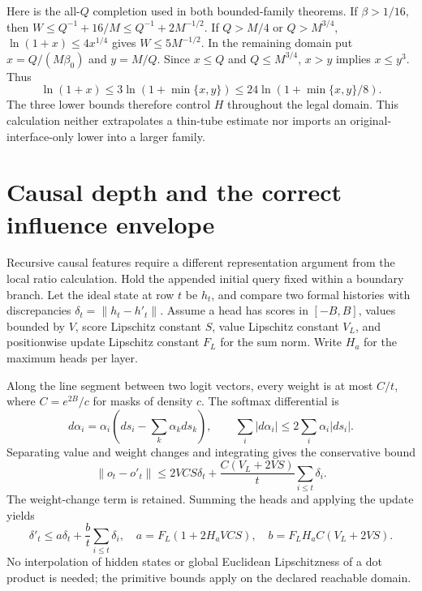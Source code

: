 \documentclass[11pt,letterpaper]{article}
\theoremstyle{definition}\newtheorem{definition}[theorem]{Definition}
\theoremstyle{remark}\newtheorem{remark}[theorem]{Remark}
\newcommand{\betaz}{\beta_0}
\begin{document}
Here is the all-$Q$ completion used in both bounded-family theorems. If $\beta>1/16$, then $W\le Q^{-1}+16/M\le Q^{-1}+2M^{-1/2}$. If $Q>M/4$ or $Q>M^{3/4}$, $\ln(1+x)\le4x^{1/4}$ gives $W\le5M^{-1/2}$. In the remaining domain put $x=Q/(M\betaz)$ and $y=M/Q$. Since $x\le Q$ and $Q\le M^{3/4}$, $x>y$ implies $x\le y^3$. Thus
\[
 \ln(1+x)\le3\ln(1+\min\{x,y\})
 \le24\ln(1+\min\{x,y\}/8).
\]
The three lower bounds therefore control $H$ throughout the legal domain. This calculation neither extrapolates a thin-tube estimate nor imports an original-interface-only lower into a larger family.

\section{Causal depth and the correct influence envelope}\label{sec:causal}
Recursive causal features require a different representation argument from the local ratio calculation. Hold the appended initial query fixed within a boundary branch. Let the ideal state at row $t$ be $h_t$, and compare two formal histories with discrepancies $\delta_t=\|h_t-h'_t\|$. Assume a head has scores in $[-B,B]$, values bounded by $V$, score Lipschitz constant $S$, value Lipschitz constant $V_L$, and positionwise update Lipschitz constant $F_L$ for the sum norm. Write $H_a$ for the maximum heads per layer.

Along the line segment between two logit vectors, every weight is at most $C/t$, where $C=e^{2B}/c$ for masks of density $c$. The softmax differential is
\[
 d\alpha_i=\alpha_i\left(ds_i-\sum_k\alpha_kds_k\right),\qquad
 \sum_i|d\alpha_i|\le2\sum_i\alpha_i|ds_i|.
\]
Separating value and weight changes and integrating gives the conservative bound
\[
 \|o_t-o'_t\|\le2VCS\delta_t+
 \frac{C(V_L+2VS)}{t}\sum_{i\le t}\delta_i.
\]
The weight-change term is retained. Summing the heads and applying the update yields
\begin{equation}\label{eq:recurrence}
 \delta'_t\le a\delta_t+\frac b t\sum_{i\le t}\delta_i,
 \quad a=F_L(1+2H_aVCS),\quad b=F_LH_aC(V_L+2VS).
\end{equation}
No interpolation of hidden states or global Euclidean Lipschitzness of a dot product is needed; the primitive bounds apply on the declared reachable domain.
\end{document}
